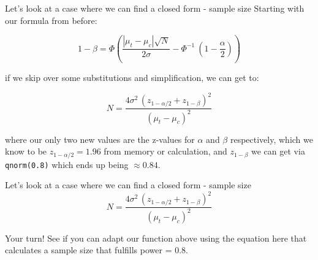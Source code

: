 \documentclass[
  ignorenonframetext,
  aspectratio=169,
]{beamer}
\begin{document}
\begin{frame}[fragile]{Let's look at a case where we can find a closed
form - sample size}
\label{lets-look-at-a-case-where-we-can-find-a-closed-form---sample-size}
Starting with our formula from before:

\[
1 - \beta = \Phi \left( \frac{ | \mu_t - \mu_c | \sqrt{N}}{2\sigma} - \Phi^{-1}\ \left(1-\frac{\alpha}{2}\right) \right)
\]

if we skip over some substitutions and simplification, we can get to:

\[
\boxed{N = \frac{4\sigma^2\,(z_{1-\alpha/2} + z_{1-\beta})^2}{(\mu_t - \mu_c)^2}}
\]

where our only two new values are the z-values for \(\alpha\) and
\(\beta\) respectively, which we know to be \(z_{1-\alpha/2} = 1.96\)
from memory or calculation, and \(z_{1-\beta}\) we can get via
\texttt{qnorm(0.8)} which ends up being \(\approx 0.84\).
\end{frame}

\begin{frame}{Let's look at a case where we can find a closed form -
sample size}
\label{lets-look-at-a-case-where-we-can-find-a-closed-form---sample-size-1}
\[
\boxed{N = \frac{4\sigma^2\,(z_{1-\alpha/2} + z_{1-\beta})^2}{(\mu_t - \mu_c)^2}}
\]

Your turn! See if you can adapt our function above using the equation
here that calculates a sample size that fulfills power = 0.8.
\end{frame}
\end{document}
